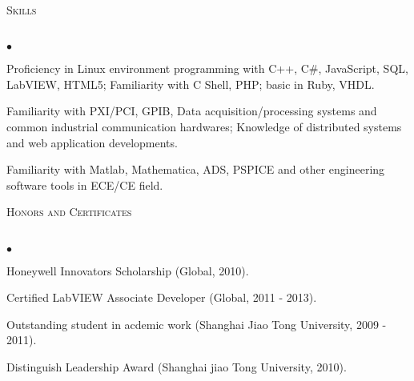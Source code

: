 \documentclass{article}
\newcommand{\lineunder}{\vspace*{-8pt} \\ \hspace*{-18pt} \hrulefill \\}
\newcommand{\header}[1]{{\hspace*{-15pt}\vspace*{6pt} \textsc{#1}} \vspace*{-6pt} \lineunder}
\newenvironment{achievements}{\begin{list}{$\bullet$}{\topsep 0pt \itemsep -2pt}}{\vspace*{4pt}\end{list}}
\begin{document}
\header{Skills}
\begin{achievements}
\item Proficiency in Linux environment programming with C++, C\#, JavaScript, SQL, LabVIEW, HTML5; Familiarity with C Shell, PHP; basic in Ruby, VHDL.
\item Familiarity with PXI/PCI, GPIB, Data acquisition/processing systems and common industrial communication hardwares; Knowledge of distributed systems and web application developments.
\item Familiarity with Matlab, Mathematica, ADS, PSPICE and other engineering software tools in ECE/CE field.
\end{achievements}

\header{Honors and Certificates}
\begin{achievements}
\item Honeywell Innovators Scholarship (Global, 2010).
\item Certified LabVIEW Associate Developer (Global, 2011 - 2013).
\item Outstanding student in acdemic work (Shanghai Jiao Tong University, 2009 - 2011).
\item Distinguish Leadership Award (Shanghai jiao Tong University, 2010).
\end{achievements}
\end{document}
